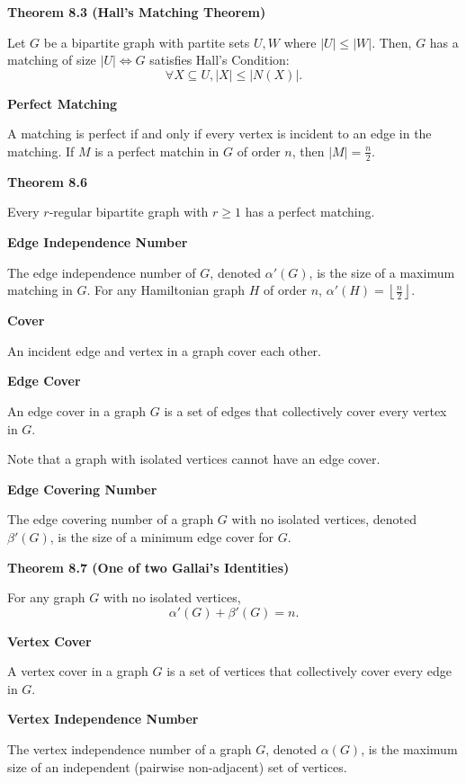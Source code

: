 \documentclass{article}
\begin{document}
\medskip\noindent\textbf{Theorem 8.3 (Hall's Matching Theorem)}

	Let $G$ be a bipartite graph with partite sets $U,W$ where $|U| \leq |W|$.
	Then, $G$ has a matching of size $|U| \iff G$ satisfies Hall's Condition: $$\forall X \subseteq U, |X| \leq |N(X)|.$$

\medskip\noindent\textbf{Perfect Matching}

	A matching is perfect if and only if every vertex is incident to an edge in the matching. If $M$ is a perfect matchin in $G$ of order $n$, then $|M| = \frac n2$.

\medskip\noindent\textbf{Theorem 8.6}

	Every $r$-regular bipartite graph with $r \geq 1$ has a perfect matching.

\medskip\noindent\textbf{Edge Independence Number}

	The edge independence number of $G$, denoted $\alpha'(G)$, is the size of a maximum matching in $G$.
	For any Hamiltonian graph $H$ of order $n$, $\alpha'(H) = \left\lfloor \frac n2 \right\rfloor$.

\medskip\noindent\textbf{Cover}

	An incident edge and vertex in a graph cover each other.

\medskip\noindent\textbf{Edge Cover}

	An edge cover in a graph $G$ is a set of edges that collectively cover every vertex in $G$.

	Note that a graph with isolated vertices cannot have an edge cover.

\medskip\noindent\textbf{Edge Covering Number}

	The edge covering number of a graph $G$ with no isolated vertices, denoted $\beta'(G)$, is the size of a minimum edge cover for $G$.

\medskip\noindent\textbf{Theorem 8.7 (One of two Gallai's Identities)}

	For any graph $G$ with no isolated vertices, $$\alpha'(G) + \beta'(G) = n.$$

\medskip\noindent\textbf{Vertex Cover}

	A vertex cover in a graph $G$ is a set of vertices that collectively cover every edge in $G$.

\medskip\noindent\textbf{Vertex Independence Number}

	The vertex independence number of a graph $G$, denoted $\alpha(G)$, is the maximum size of an independent (pairwise non-adjacent) set of vertices.
\end{document}
